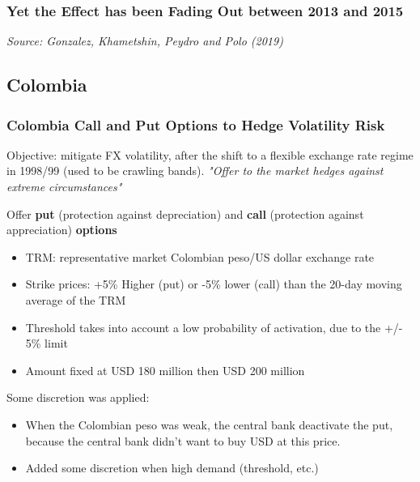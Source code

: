\documentclass{beamer}
\newenvironment{wideitemize}{\itemize\addtolength{\itemsep}{10pt}}{\enditemize}
\begin{document}
\begin{frame}
  \frametitle{Yet the Effect has been Fading Out between 2013 and 2015}
  \medskip
  \emph{Source: Gonzalez, Khametshin, Peydro and Polo (2019)}

  
\end{frame}


\subsection{Colombia}

\begin{frame}
  \frametitle{Colombia Call and Put Options to Hedge Volatility Risk}
  \begin{wideitemize}
    \item Objective: mitigate FX volatility, after the shift to a flexible exchange rate regime in 1998/99 (used to be crawling bands). \emph{"Offer to the market hedges against extreme circumstances"}
    \item Offer \textbf{put} (protection against depreciation) and \textbf{call} (protection against appreciation) \textbf{options}
      \begin{itemize}
      \item TRM: representative market Colombian peso/US dollar exchange rate
      \item Strike prices: +5\% Higher (put) or -5\% lower (call) than the 20-day moving average of the TRM 
      \item Threshold takes into account a low probability of activation, due to the +/- 5\% limit
      \item Amount fixed at USD 180 million then USD 200 million
      \end{itemize}
    \item Some discretion was applied: 
      \begin{itemize}
      \item When the Colombian peso was weak, the central bank deactivate the put, because the central bank didn't want to buy USD at this price.
      \item Added some discretion when high demand (threshold, etc.)
      \end{itemize}      
  \end{wideitemize}
\end{frame}
\end{document}
